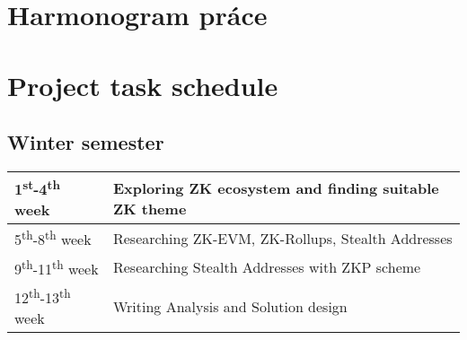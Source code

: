 \thispagestyle{empty}

\ifx\FIITlagEN\undefined
\chapter{Harmonogram práce}
\else
\chapter{Project task schedule}
\fi

\renewcommand*{\thepage}{B-\arabic{page}}

\section{Winter semester}

\begin{tabular}{|l||l|}
\hline
1\textsuperscript{st}-4\textsuperscript{th} week    & Exploring ZK ecosystem and finding suitable ZK theme \\
\hline
5\textsuperscript{th}-8\textsuperscript{th} week    & Researching ZK-EVM, ZK-Rollups, Stealth Addresses \\
\hline
9\textsuperscript{th}-11\textsuperscript{th} week   & Researching Stealth Addresses with ZKP scheme \\
\hline
12\textsuperscript{th}-13\textsuperscript{th} week  & Writing Analysis and Solution design \\
\hline
\end{tabular}

